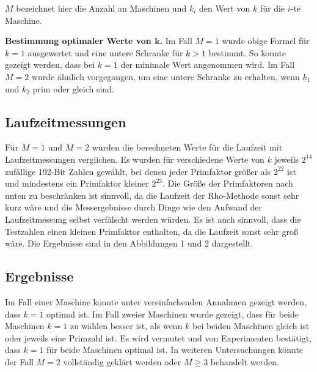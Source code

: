 \documentclass[a4paper, extrafontsizes, ngerman, 25pt]{memoir}
\begin{document}
\begin{figure}[H]
    \centering
    
\end{figure}

\noindent $M$ bezeichnet hier die Anzahl an Maschinen und $k_i$ den Wert von $k$ für die $i$-te Maschine.

\vspace{0.5cm}
\noindent \textbf{Bestimmung optimaler Werte von $\boldsymbol{k}$.} Im Fall $M = 1$ wurde obige Formel für $k = 1$ ausgewertet und eine untere Schranke für $k > 1$ bestimmt. So konnte gezeigt werden, dass bei $k = 1$ der minimale Wert angenommen wird. Im Fall $M = 2$ wurde ähnlich vorgegangen, um eine untere Schranke zu erhalten, wenn $k_1$ und $k_2$ prim oder gleich sind.

\vspace{2.3cm}
\subsection{Laufzeitmessungen}

Für $M = 1$ und $M = 2$ wurden die berechneten Werte für die Laufzeit mit Laufzeitmessungen verglichen. Es wurden für verschiedene Werte von $k$ jeweils $2^{14}$ zufällige 192-Bit Zahlen gewählt, bei denen jeder Primfaktor größer als $2^{22}$ ist und mindestens ein Primfaktor kleiner $2^{23}$. Die Größe der Primfaktoren nach unten zu beschränken ist sinnvoll, da die Laufzeit der Rho-Methode sonst sehr kurz wäre und die Messergebnisse durch Dinge wie den Aufwand der Laufzeitmessung selbst verfälscht werden würden. Es ist auch sinnvoll, dass die Testzahlen einen kleinen Primfaktor enthalten, da die Laufzeit sonst sehr groß wäre. Die Ergebnisse sind in den Abbildungen 1 und 2 dargestellt.

\vspace{2.3cm}
\subsection{Ergebnisse}

Im Fall einer Maschine konnte unter vereinfachenden Annahmen gezeigt werden, dass $k = 1$ optimal ist. Im Fall zweier Maschinen wurde gezeigt, dass für beide Maschinen $k = 1$ zu wählen besser ist, als wenn $k$ bei beiden Maschinen gleich ist oder jeweils eine Primzahl ist. Es wird vermutet und von Experimenten bestätigt, dass $k = 1$ für beide Maschinen optimal ist. In weiteren Untersuchungen könnte der Fall $M = 2$ vollständig geklärt werden oder $M \ge 3$ behandelt werden.
\end{document}
